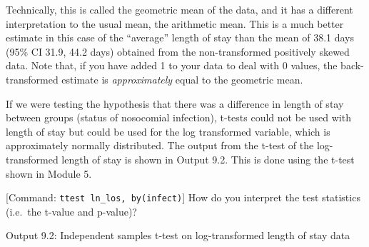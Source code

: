 \documentclass[
]{memoir}
\begin{document}
Technically, this is called the geometric mean of the data, and it has a different interpretation to the usual mean, the arithmetic mean. This is a much better estimate in this case of the ``average'' length of stay than the mean of 38.1 days (95\% CI 31.9, 44.2 days) obtained from the non-transformed positively skewed data. Note that, if you have added 1 to your data to deal with 0 values, the back-transformed estimate is \emph{approximately} equal to the geometric mean.

If we were testing the hypothesis that there was a difference in length of stay between groups (status of nosocomial infection), t-tests could not be used with length of stay but could be used for the log transformed variable, which is approximately normally distributed. The output from the t-test of the log-transformed length of stay is shown in Output 9.2. This is done using the t-test shown in Module 5.

{[}Command: \texttt{ttest\ ln\_los,\ by(infect)}{]} How do you interpret the test statistics (i.e.~the t-value and p-value)?

Output 9.2: Independent samples t-test on log-transformed length of stay data
\end{document}
